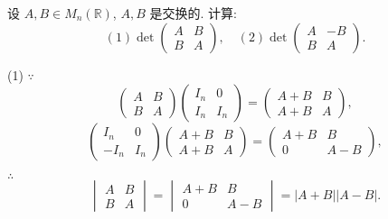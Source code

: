 \documentclass{ctexart}
\begin{document}
\begin{exercise}[补充题 3]
    设 $A,B\in M_n(\mathbb{R})$, $A,B$ 是交换的. 计算:
    \[(1)\det\begin{pmatrix}
        A & B \\
        B & A
    \end{pmatrix},\quad(2)\det\begin{pmatrix}
        A & -B \\
        B & A
    \end{pmatrix}.\]
\end{exercise}
\begin{solution}
    (1) $\because$
    \[\begin{pmatrix}
        A & B \\
        B & A
    \end{pmatrix}\begin{pmatrix}
        I_n & 0 \\
        I_n & I_n
    \end{pmatrix}=\begin{pmatrix}
        A+B & B \\
        A+B & A
    \end{pmatrix},\]
    \[\begin{pmatrix}
        I_n & 0 \\
        -I_n & I_n
    \end{pmatrix}\begin{pmatrix}
        A+B & B \\
        A+B & A
    \end{pmatrix}=\begin{pmatrix}
        A+B & B \\
        0 & A-B
    \end{pmatrix},\]

    $\therefore$
    \[\begin{vmatrix}
        A & B \\
        B & A
    \end{vmatrix}=\begin{vmatrix}
        A+B & B \\
        0 & A-B
    \end{vmatrix}=|A+B||A-B|.\]


\end{solution}
\end{document}
